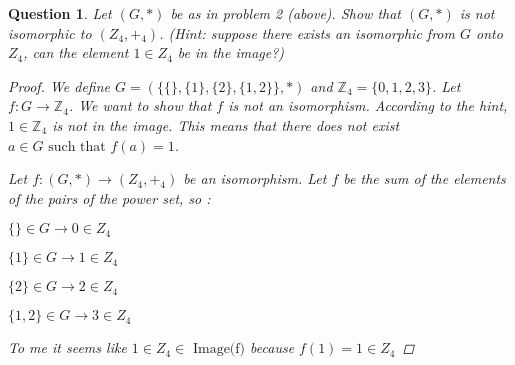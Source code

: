 \documentclass{article}
\newcommand*{\field}[1]{\mathbb{#1}}%
\newtheorem{ques}{Question}
\begin{document}
\begin{ques}
	Let $(G, *)$ be as in problem 2 (above). Show that $(G, *)$ is not isomorphic to $(Z_4, +_4)$. (Hint: suppose there exists an isomorphic from $G$ onto $Z_4$, can	the element $1 \in Z_4$ be in the image?)	
	\begin{proof}
		We define $G = (\{\{\}, \{1\}, \{2\}, \{1, 2\}\}, *)$ and $\field{Z}_4 = \{0, 1, 2, 3\}$. Let $f: G \rightarrow \field{Z}_4$. We want to show that $f$ is not an isomorphism. According to the hint, $1 \in \field{Z}_4$ is not in the image. This means that there does not exist $a \in G \text{ such that } f(a) = 1$.
		
		Let $f : (G, *) \rightarrow (Z_4, +_4)$ be an isomorphism. Let $f$ be the sum of the elements of the pairs of the power set, so :
		
		$\{\} \in G \rightarrow 0 \in Z_4$
		
		$\{1\} \in G \rightarrow 1 \in Z_4$
	
		$\{2\} \in G \rightarrow 2 \in Z_4$
		
		$\{1, 2\} \in G \rightarrow 3 \in Z_4$

		To me it seems like $1 \in Z_4 \in \text{ Image(f)}$ because $f({1}) = 1 \in Z_4$

	\end{proof}
\end{ques}
\end{document}

